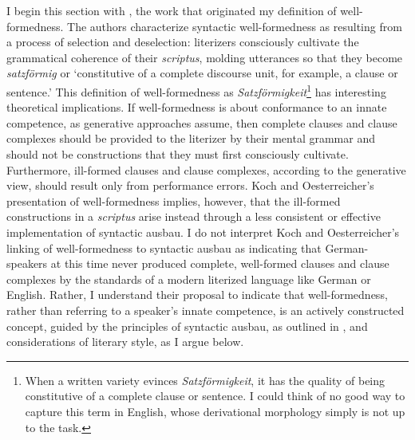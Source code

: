 I begin this section with \citet[590--591]{KochOesterreicher1994}, the work that originated my definition of well-formedness. The authors characterize syntactic well-formedness as resulting from a process of selection and deselection: literizers consciously cultivate the grammatical coherence of their \textit{scriptus}, molding utterances so that they become \textit{satzförmig} or ‘constitutive of a complete discourse unit, for example, a clause or sentence.’ This definition of well-formedness as \textit{Satzförmigkeit}\footnote{{When a written variety evinces} {\textit{Satzförmigkeit}}{, it has the quality of being constitutive of a complete clause or sentence. I could think of no good way to capture this term in English, whose derivational morphology simply is not up to the task.} } has interesting theoretical implications. If well-formedness is about conformance to an innate competence, as generative approaches assume, then complete clauses and clause complexes should be provided to the literizer by their mental grammar and should not be constructions that they must first consciously cultivate. Furthermore, ill-formed clauses and clause complexes, according to the generative view, should result only from performance errors. Koch and Oesterreicher’s presentation of well-formedness implies, however, that the ill-formed constructions in a \textit{scriptus} arise instead through a less consistent or effective implementation of syntactic ausbau. I do not interpret Koch and Oesterreicher’s linking of well-formedness to syntactic ausbau as indicating that German-speakers at this time never produced complete, well-formed clauses and clause complexes by the standards of a modern literized language like German or English. Rather, I understand their proposal to indicate that well-formedness, rather than referring to a speaker’s innate competence, is an actively constructed concept, guided by the principles of syntactic ausbau, as outlined in , and considerations of literary style, as I argue below.

